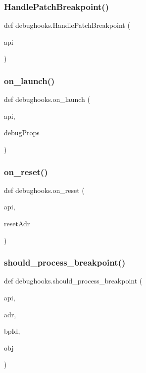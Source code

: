 \subsubsection{\texorpdfstring{Handle\+Patch\+Breakpoint()}{HandlePatchBreakpoint()}}
{\footnotesize\ttfamily def debughooks.\+Handle\+Patch\+Breakpoint (\begin{DoxyParamCaption}\item[{}]{api }\end{DoxyParamCaption})}

\mbox{\label{namespacedebughooks_ac7b06df66dc219922f1ad5a6734f71c6}} 
\subsubsection{\texorpdfstring{on\+\_\+launch()}{on\_launch()}}
{\footnotesize\ttfamily def debughooks.\+on\+\_\+launch (\begin{DoxyParamCaption}\item[{}]{api,  }\item[{}]{debug\+Props }\end{DoxyParamCaption})}

\mbox{\label{namespacedebughooks_a0ee6ce3e0aacdd1e5758492f69f995f8}} 
\subsubsection{\texorpdfstring{on\+\_\+reset()}{on\_reset()}}
{\footnotesize\ttfamily def debughooks.\+on\+\_\+reset (\begin{DoxyParamCaption}\item[{}]{api,  }\item[{}]{reset\+Adr }\end{DoxyParamCaption})}

\mbox{\label{namespacedebughooks_acdaada684f14959e258414534d569f71}} 
\subsubsection{\texorpdfstring{should\+\_\+process\+\_\+breakpoint()}{should\_process\_breakpoint()}}
{\footnotesize\ttfamily def debughooks.\+should\+\_\+process\+\_\+breakpoint (\begin{DoxyParamCaption}\item[{}]{api,  }\item[{}]{adr,  }\item[{}]{bp\+Id,  }\item[{}]{obj }\end{DoxyParamCaption})}



